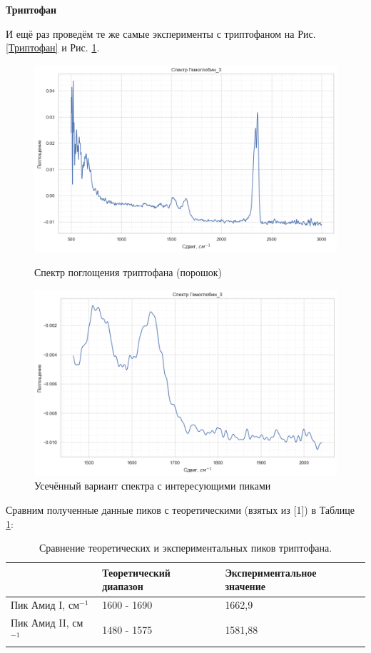 \documentclass{article}
\begin{document}
\textbf{Триптофан}

И ещё раз проведём те же самые эксперименты с триптофаном на Рис. \ref{Триптофан} и Рис. \ref{Триптофан усечённое}. 

\begin{figure}[h!] 
        \centering
        \centering
            \includegraphics[width=0.9\linewidth]{Images/Гемоглобин.png}
                 \caption{Спектр поглощения триптофана (порошок)}
                 \label{Триптофан}
        \endminipage\hfill
        \centering
             \includegraphics[width=0.9\linewidth]{Images/Гемоглобин усечённое.png}
                 \caption{Усечённый вариант спектра с интересующими пиками}
                 \label{Триптофан усечённое}
        \endminipage
\end{figure}

Сравним полученные данные пиков с теоретическими (взятых из [1]) в Таблице \ref{Триптофан_табл}:

\begin{table}[h!]
\centering
\caption{Сравнение теоретических и экспериментальных пиков триптофана.}
\begin{tabular}{|l|l|l|}
\hline
 & Теоретический диапазон & Экспериментальное значение \\ \hline
Пик Амид I, см$^{-1}$ & 1600 - 1690 & 1662,9 \\ \hline
Пик Амид II, см$^{-1}$& 1480 - 1575 & 1581,88 \\ \hline
\end{tabular}
\label{Триптофан_табл}
\end{table}
\end{document}
